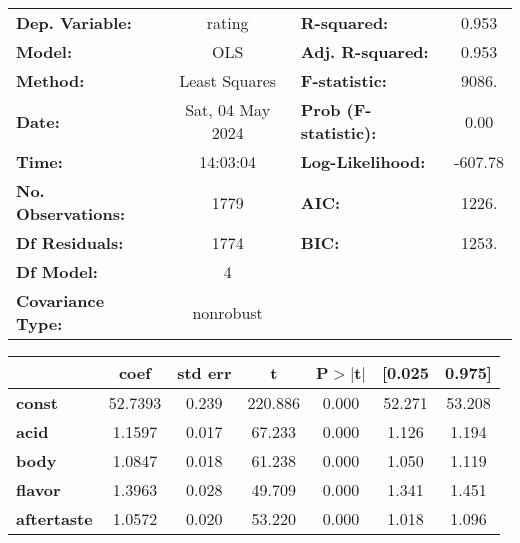 \documentclass[11pt]{article}
\newcommand{\prompt}[4]{
        {\ttfamily\llap{{\color{#2}[#3]:\hspace{3pt}#4}}\vspace{-\baselineskip}}
    }
\begin{document}
            
\prompt{Out}{outcolor}{15}{}
    
    \begin{center}
\begin{tabular}{lclc}
\toprule
\textbf{Dep. Variable:}    &      rating      & \textbf{  R-squared:         } &     0.953   \\
\textbf{Model:}            &       OLS        & \textbf{  Adj. R-squared:    } &     0.953   \\
\textbf{Method:}           &  Least Squares   & \textbf{  F-statistic:       } &     9086.   \\
\textbf{Date:}             & Sat, 04 May 2024 & \textbf{  Prob (F-statistic):} &     0.00    \\
\textbf{Time:}             &     14:03:04     & \textbf{  Log-Likelihood:    } &   -607.78   \\
\textbf{No. Observations:} &        1779      & \textbf{  AIC:               } &     1226.   \\
\textbf{Df Residuals:}     &        1774      & \textbf{  BIC:               } &     1253.   \\
\textbf{Df Model:}         &           4      & \textbf{                     } &             \\
\textbf{Covariance Type:}  &    nonrobust     & \textbf{                     } &             \\
\bottomrule
\end{tabular}
\begin{tabular}{lcccccc}
                    & \textbf{coef} & \textbf{std err} & \textbf{t} & \textbf{P$> |$t$|$} & \textbf{[0.025} & \textbf{0.975]}  \\
\midrule
\textbf{const}      &      52.7393  &        0.239     &   220.886  &         0.000        &       52.271    &       53.208     \\
\textbf{acid}       &       1.1597  &        0.017     &    67.233  &         0.000        &        1.126    &        1.194     \\
\textbf{body}       &       1.0847  &        0.018     &    61.238  &         0.000        &        1.050    &        1.119     \\
\textbf{flavor}     &       1.3963  &        0.028     &    49.709  &         0.000        &        1.341    &        1.451     \\
\textbf{aftertaste} &       1.0572  &        0.020     &    53.220  &         0.000        &        1.018    &        1.096     \\

\end{tabular}
\end{center}
\end{document}
